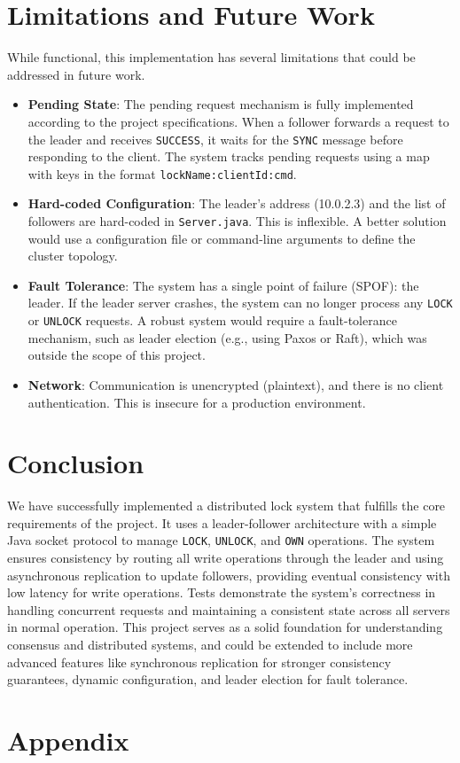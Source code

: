 \documentclass[a4paper,11pt]{article}
\begin{document}
\section{Limitations and Future Work}
While functional, this implementation has several limitations that could be addressed in future work.
\begin{itemize}
    \item \textbf{Pending State}: The pending request mechanism is fully implemented according to the project specifications. When a follower forwards a request to the leader and receives \texttt{SUCCESS}, it waits for the \texttt{SYNC} message before responding to the client. The system tracks pending requests using a map with keys in the format \texttt{lockName:clientId:cmd}.
    \item \textbf{Hard-coded Configuration}: The leader's address (10.0.2.3) and the list of followers are hard-coded in \texttt{Server.java}. This is inflexible. A better solution would use a configuration file or command-line arguments to define the cluster topology.
    \item \textbf{Fault Tolerance}: The system has a single point of failure (SPOF): the leader. If the leader server crashes, the system can no longer process any \texttt{LOCK} or \texttt{UNLOCK} requests. A robust system would require a fault-tolerance mechanism, such as leader election (e.g., using Paxos or Raft), which was outside the scope of this project.
    \item \textbf{Network}: Communication is unencrypted (plaintext), and there is no client authentication. This is insecure for a production environment.
\end{itemize}

\section{Conclusion}
We have successfully implemented a distributed lock system that fulfills the core requirements of the project. It uses a leader-follower architecture with a simple Java socket protocol to manage \texttt{LOCK}, \texttt{UNLOCK}, and \texttt{OWN} operations. The system ensures consistency by routing all write operations through the leader and using asynchronous replication to update followers, providing eventual consistency with low latency for write operations. Tests demonstrate the system's correctness in handling concurrent requests and maintaining a consistent state across all servers in normal operation. This project serves as a solid foundation for understanding consensus and distributed systems, and could be extended to include more advanced features like synchronous replication for stronger consistency guarantees, dynamic configuration, and leader election for fault tolerance.

\section{Appendix}
\end{document}

